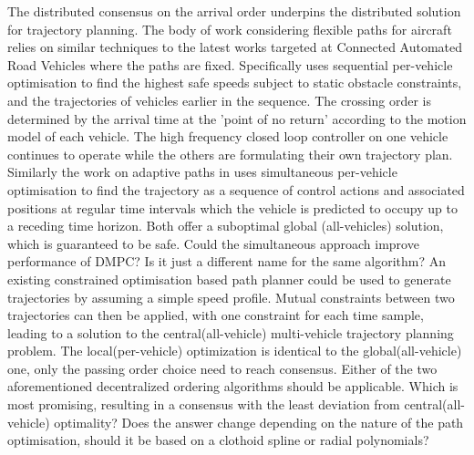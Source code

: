 \documentclass[11pt]{article} %
\begin{document}
The distributed consensus on the arrival order underpins the distributed solution for trajectory planning. The body of work considering flexible paths for aircraft relies on similar techniques to the latest works targeted at Connected Automated Road Vehicles where the paths are fixed. Specifically \cite{Liu2018} uses sequential per-vehicle optimisation to find the highest safe speeds subject to static obstacle constraints, and the trajectories of vehicles earlier in the sequence. The crossing order is determined by the arrival time at the 'point of no return' according to the motion model of each vehicle. The high frequency closed loop controller on one vehicle continues to operate while the others are formulating their own trajectory plan. Similarly the work on adaptive paths in \cite{Luis2018} uses simultaneous per-vehicle optimisation to find the trajectory as a sequence of control actions and associated positions at regular time intervals which the vehicle is predicted to occupy up to a receding time horizon. Both offer a suboptimal global (all-vehicles) solution, which is guaranteed to be safe. Could the simultaneous approach improve performance of DMPC? Is it just a different name for the same algorithm? An existing constrained optimisation based path planner could be used to generate trajectories by assuming a simple speed profile. Mutual constraints between two trajectories can then be applied, with one constraint for each time sample, leading to a solution to the central(all-vehicle) multi-vehicle trajectory planning problem. The local(per-vehicle) optimization is identical to the global(all-vehicle) one, only the passing order choice need to reach consensus. Either of the two aforementioned decentralized ordering algorithms should be applicable. Which is most promising, resulting in a consensus with the least deviation from central(all-vehicle) optimality? Does the answer change depending on the nature of the path optimisation, should it be based on a clothoid spline or radial polynomials?

 




\end{document}
